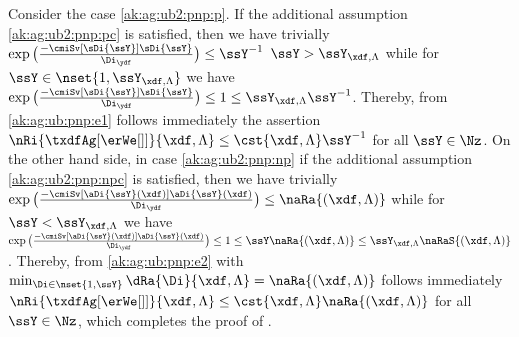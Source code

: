 \begin{pro}
  Consider the case \ref{ak:ag:ub2:pnp:p}.  If the additional
  assumption \ref{ak:ag:ub2:pnp:pc} is satisfied, then we have
  trivially
  $\exp\big(\tfrac{-\cmiSv[\sDi{\ssY}]\sDi{\ssY}}{\Di_{\ydf}}\big)\leq\ssY^{-1}$
  $\ssY> \ssY_{\xdf,\Lambda}$ while for
  $\ssY\in\nset{1,\ssY_{\xdf,\Lambda}}$ we have
  $\exp\big(\tfrac{-\cmiSv[\sDi{\ssY}]\sDi{\ssY}}{\Di_{\ydf}}\big)\leq1\leq
  \ssY_{\xdf,\Lambda} \ssY^{-1}$. Thereby, from \eqref{ak:ag:ub:pnp:e1}
  follows immediately the assertion
  $\nRi{\txdfAg[{\erWe[]}]}{\xdf,\Lambda} \leq \cst{\xdf,\Lambda}\ssY^{-1}$
  for all $\ssY\in\Nz$. On the other hand side, in case
  \ref{ak:ag:ub2:pnp:np} if the additional assumption
  \ref{ak:ag:ub2:pnp:npc} is satisfied, then we have trivially
  $\exp\big(\tfrac{-\cmiSv[\aDi{\ssY}(\xdf)]\aDi{\ssY}(\xdf)}{\Di_{\ydf}}\big)\leq
  \naRa{(\xdf,\Lambda)}$ while for $\ssY< \ssY_{\xdf,\Lambda}$ we have
  $\exp\big(\tfrac{-\cmiSv[\aDi{\ssY}(\xdf)]\aDi{\ssY}(\xdf)}{\Di_{\ydf}}\big)\leq1\leq
  \ssY\naRa{(\xdf,\Lambda)}\leq \ssY_{\xdf,\Lambda}
  \naRaS{(\xdf,\Lambda)}$. Thereby, from \eqref{ak:ag:ub:pnp:e2} with
  $\min_{\Di\in\nset{1,\ssY}}\dRa{\Di}{\xdf,\Lambda}=\naRa{(\xdf,\Lambda)}$
  follows immediately
  $ \nRi{\txdfAg[{\erWe[]}]}{\xdf,\Lambda} \leq \cst{\xdf,\Lambda}
  \naRa{(\xdf,\Lambda)}$ for all $\ssY\in\Nz$, which completes the proof of
  .\proEnd
  \end{pro}
